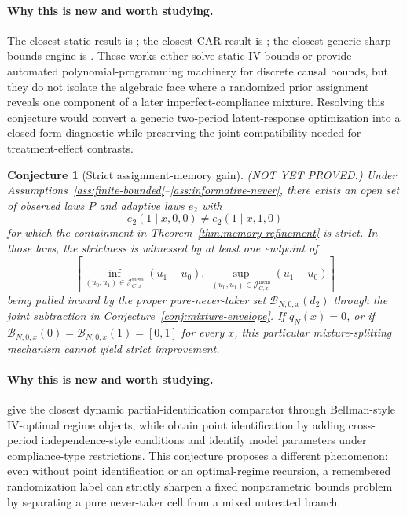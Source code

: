\documentclass[11pt]{article}
\theoremstyle{definition}
\theoremstyle{plain}
\newtheorem{conjecture}{Conjecture}
\theoremstyle{remark}
\begin{document}
\paragraph{Why this is new and worth studying.}
The closest static result is \citet{BalkePearl1997}; the closest CAR result is \citet{BugniGaoObradovicVelez2024}; the closest generic sharp-bounds engine is \citet{DuarteFinkelsteinKnoxMummoloShpitser2024}.  These works either solve static IV bounds or provide automated polynomial-programming machinery for discrete causal bounds, but they do not isolate the algebraic face where a randomized prior assignment reveals one component of a later imperfect-compliance mixture.  Resolving this conjecture would convert a generic two-period latent-response optimization into a closed-form diagnostic while preserving the joint compatibility needed for treatment-effect contrasts.

\begin{conjecture}[Strict assignment-memory gain]\label{conj:strict-gain}
(NOT YET PROVED.)  Under Assumptions~\ref{ass:finite-bounded}--\ref{ass:informative-never}, there exists an open set of observed laws \(P\) and adaptive laws \(e_2\) with
\[
e_2(1\mid x,0,0)\ne e_2(1\mid x,1,0)
\]
for which the containment in Theorem~\ref{thm:memory-refinement} is strict.  In those laws, the strictness is witnessed by at least one endpoint of
\[
\left[
\inf_{(u_0,u_1)\in\mathcal{J}_{C,x}^{\mathrm{mem}}}(u_1-u_0),\
\sup_{(u_0,u_1)\in\mathcal{J}_{C,x}^{\mathrm{mem}}}(u_1-u_0)
\right]
\]
being pulled inward by the proper pure-never-taker set \(\mathcal{B}_{N,0,x}(d_2)\) through the joint subtraction in Conjecture~\ref{conj:mixture-envelope}.  If \(q_N(x)=0\), or if \(\mathcal{B}_{N,0,x}(0)=\mathcal{B}_{N,0,x}(1)=[0,1]\) for every \(x\), this particular mixture-splitting mechanism cannot yield strict improvement.
\end{conjecture}
\paragraph{Why this is new and worth studying.}
\citet{ChenZhang2023} give the closest dynamic partial-identification comparator through Bellman-style IV-optimal regime objects, while \citet{SojitraSyrgkanis2024} obtain point identification by adding cross-period independence-style conditions and \citet{MichaelCuiLorchTchetgen2024} identify model parameters under compliance-type restrictions.  This conjecture proposes a different phenomenon: even without point identification or an optimal-regime recursion, a remembered randomization label can strictly sharpen a fixed nonparametric bounds problem by separating a pure never-taker cell from a mixed untreated branch.
\end{document}
